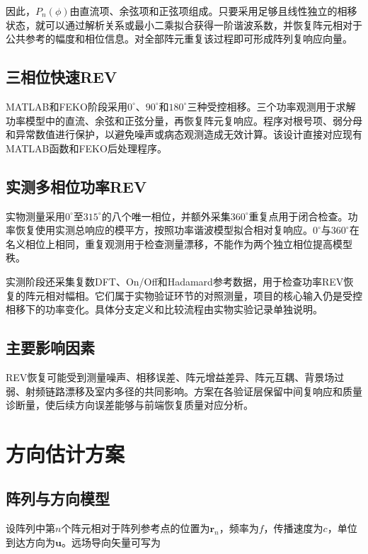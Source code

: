 \documentclass[UTF8,a4paper,12pt]{ctexart}
\newcommand{\vect}[1]{\boldsymbol{#1}}
\begin{document}
因此，$P_n(\phi)$由直流项、余弦项和正弦项组成。只要采用足够且线性独立的相移状态，就可以通过解析关系或最小二乘拟合获得一阶谐波系数，并恢复阵元相对于公共参考的幅度和相位信息。对全部阵元重复该过程即可形成阵列复响应向量。

\subsection{三相位快速REV}

MATLAB和FEKO阶段采用$0^\circ$、$90^\circ$和$180^\circ$三种受控相移。三个功率观测用于求解功率模型中的直流、余弦和正弦分量，再恢复阵元复响应。程序对根号项、弱分母和异常数值进行保护，以避免噪声或病态观测造成无效计算。该设计直接对应现有MATLAB函数和FEKO后处理程序。

\subsection{实测多相位功率REV}

实物测量采用$0^\circ$至$315^\circ$的八个唯一相位，并额外采集$360^\circ$重复点用于闭合检查。功率恢复使用实测总响应的模平方，按照功率谐波模型拟合相对复响应。$0^\circ$与$360^\circ$在名义相位上相同，重复观测用于检查测量漂移，不能作为两个独立相位提高模型秩。

实测阶段还采集复数DFT、On/Off和Hadamard参考数据，用于检查功率REV恢复的阵元相对幅相。它们属于实物验证环节的对照测量，项目的核心输入仍是受控相移下的功率变化。具体分支定义和比较流程由实物实验记录单独说明。

\subsection{主要影响因素}

REV恢复可能受到测量噪声、相移误差、阵元增益差异、阵元互耦、背景场过弱、射频链路漂移及室内多径的共同影响。方案在各验证层保留中间复响应和质量诊断量，使后续方向误差能够与前端恢复质量对应分析。

\section{方向估计方案}

\subsection{阵列与方向模型}

设阵列中第$n$个阵元相对于阵列参考点的位置为$\vect r_n$，频率为$f$，传播速度为$c$，单位到达方向为$\vect u$。远场导向矢量可写为
\end{document}
